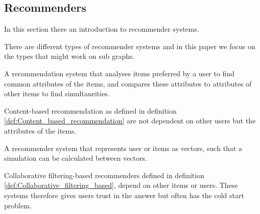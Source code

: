 \subsection{Recommenders}
In this section there an introduction to recommender systems.

There are different types of recommender systems and in this paper we focus on the types that might work on sub graphs.

\begin{definition} \label{def:Content_based_recommendation}
A recommendation system that analyses items preferred by a user to find common attributes of the items, and compares these attributes to attributes of other items to find simultaneities\cite{lu2015recommender}. 
\end{definition}

Content-based recommendation as defined in definition \ref{def:Content_based_recommendation} are not dependent on other users but the attributes of the items.

\begin{definition}\label{def:Collaborative_filtering_based}
A recommender system that represents user or items as vectors, such that a simulation can be calculated between vectors\cite{lu2015recommender}.
\end{definition}

Collaborative filtering-based recommenders defined in definition \ref{def:Collaborative_filtering_based}, depend on other items or users. These systems therefore gives users trust in the answer but often has the cold start problem.